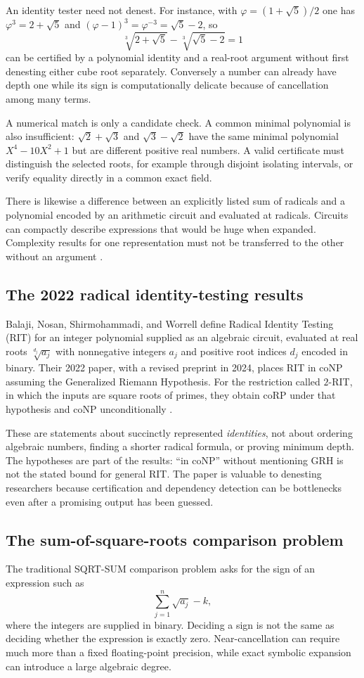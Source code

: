 \documentclass[11pt,oneside]{article}
\numberwithin{equation}{section}
\theoremstyle{definition}
\theoremstyle{remark}
\begin{document}
An identity tester need not denest. For instance, with $\varphi=(1+\sqrt5)/2$ one has $\varphi^3=2+\sqrt5$ and $(\varphi-1)^3=\varphi^{-3}=\sqrt5-2$, so
\[
\sqrt[3]{2+\sqrt5}-\sqrt[3]{\sqrt5-2}=1
\]
can be certified by a polynomial identity and a real-root argument without first denesting either cube root separately. Conversely a number can already have depth one while its sign is computationally delicate because of cancellation among many terms.

A numerical match is only a candidate check. A common minimal polynomial is also insufficient: $\sqrt2+\sqrt3$ and $\sqrt3-\sqrt2$ have the same minimal polynomial $X^4-10X^2+1$ but are different positive real numbers. A valid certificate must distinguish the selected roots, for example through disjoint isolating intervals, or verify equality directly in a common exact field.

There is likewise a difference between an explicitly listed sum of radicals and a polynomial encoded by an arithmetic circuit and evaluated at radicals. Circuits can compactly describe expressions that would be huge when expanded. Complexity results for one representation must not be transferred to the other without an argument \cite{blomer91,blomer98,rit}.

\subsection{The 2022 radical identity-testing results}
Balaji, Nosan, Shirmohammadi, and Worrell define Radical Identity Testing (RIT) for an integer polynomial supplied as an algebraic circuit, evaluated at real roots $\sqrt[d_j]{a_j}$ with nonnegative integers $a_j$ and positive root indices $d_j$ encoded in binary. Their 2022 paper, with a revised preprint in 2024, places RIT in coNP assuming the Generalized Riemann Hypothesis. For the restriction called $2$-RIT, in which the inputs are square roots of primes, they obtain coRP under that hypothesis and coNP unconditionally \cite{rit}.

These are statements about succinctly represented \emph{identities}, not about ordering algebraic numbers, finding a shorter radical formula, or proving minimum depth. The hypotheses are part of the results: ``in coNP'' without mentioning GRH is not the stated bound for general RIT. The paper is valuable to denesting researchers because certification and dependency detection can be bottlenecks even after a promising output has been guessed.

\subsection{The sum-of-square-roots comparison problem}
The traditional SQRT-SUM comparison problem asks for the sign of an expression such as
\[
\sum_{j=1}^n\sqrt{a_j}-k,
\]
where the integers are supplied in binary. Deciding a sign is not the same as deciding whether the expression is exactly zero. Near-cancellation can require much more than a fixed floating-point precision, while exact symbolic expansion can introduce a large algebraic degree.
\end{document}
